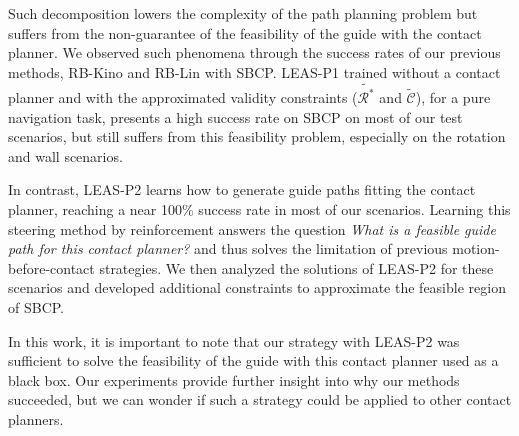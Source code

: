 Such decomposition lowers the complexity of the path planning problem but suffers from the non-guarantee of the feasibility of the guide with the contact planner.
We observed such phenomena through the success rates of our previous methods, RB-Kino and RB-Lin with SBCP.
LEAS-P1 trained without a contact planner and with the approximated validity constraints ($\tilde{\mathcal{R}^*}$ and $\tilde{\mathcal{C}}$), for a pure navigation task, presents a high success rate on SBCP on most of our test scenarios, but still suffers from this feasibility problem, especially on the rotation and wall scenarios.

In contrast, LEAS-P2 learns how to generate guide paths fitting the contact planner, reaching a near 100\% success rate in most of our scenarios. Learning this steering method by reinforcement answers the question \textit{What is a feasible guide path for this contact planner?} and thus solves the limitation of previous motion-before-contact strategies.
We then analyzed the solutions of LEAS-P2 for these scenarios and developed additional constraints to approximate the feasible region of SBCP.

In this work, it is important to note that our strategy with LEAS-P2 was sufficient to solve the feasibility of the guide with this contact planner used as a black box.
Our experiments provide further insight into why our methods succeeded, but we can wonder if such a strategy could be applied to other contact planners.

